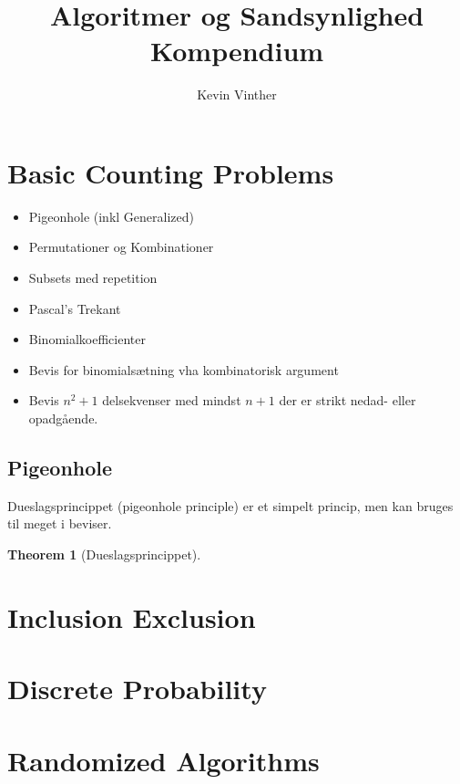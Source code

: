 \documentclass[11pt]{article}
\title{Algoritmer og Sandsynlighed \\ \large Kompendium}
\author{Kevin Vinther}
\newtheorem{theorem}{Theorem}
\theoremstyle{definition}
\theoremstyle{remark}
\begin{document}
\maketitle
\tableofcontents

\newpage


\section{Basic Counting Problems}
\label{sec:basiccounting}

\begin{itemize}
\item Pigeonhole (inkl Generalized)
\item Permutationer og Kombinationer
\item Subsets med repetition
\item Pascal's Trekant
\item Binomialkoefficienter
\item Bevis for binomialsætning vha kombinatorisk argument
\item Bevis $n^{2} + 1$ delsekvenser med mindst $n+1$ der er strikt nedad- eller opadgående. 
\end{itemize}

\subsection{Pigeonhole}
\label{subsec:pigeonhole}

Dueslagsprincippet (pigeonhole principle) er et simpelt princip, men kan bruges til meget i beviser.

\begin{theorem}[Dueslagsprincippet]
\label{theorem:pigeonhole}
\end{theorem}


\section{Inclusion Exclusion}
\label{sec:inclexcl}


\section{Discrete Probability}
\label{sec:discprob}


\section{Randomized Algorithms}
\label{sec:random}
\end{document}
